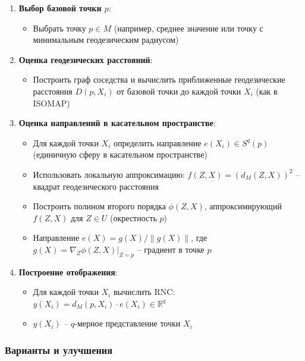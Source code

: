 \documentclass[a4paper,12pt]{article}
\begin{document}
\begin{enumerate}
    \item \textbf{Выбор базовой точки $p$}:
    \begin{itemize}
        \item Выбрать точку $p \in M$ (например, среднее значение или точку с минимальным геодезическим радиусом)
    \end{itemize}

    \item \textbf{Оценка геодезических расстояний}:
    \begin{itemize}
        \item Построить граф соседства и вычислить приближенные геодезические расстояния $D(p, X_i)$ от базовой точки до каждой точки $X_i$ (как в ISOMAP)
    \end{itemize}

    \item \textbf{Оценка направлений в касательном пространстве}:
    \begin{itemize}
        \item Для каждой точки $X_i$ определить направление $e(X_i) \in S^q(p)$ (единичную сферу в касательном пространстве)
        \item Использовать локальную аппроксимацию: $f(Z, X) = (d_M(Z, X))^2$ -- квадрат геодезического расстояния 
        \item Построить полином второго порядка $\phi(Z, X)$, аппроксимирующий $f(Z, X)$ для $Z \in U$ (окрестность $p$)
        \item Направление $e(X) = g(X)/\|g(X)\|$, где $g(X) = \nabla_Z \phi(Z, X)|_{Z=p}$ -- градиент в точке $p$
    \end{itemize}

    \item \textbf{Построение отображения}:
    \begin{itemize}
        \item Для каждой точки $X_i$ вычислить RNC: $y(X_i) = d_M(p, X_i) \cdot e(X_i) \in \mathbb{R}^q$
        \item $y(X_i)$ -- $q$-мерное представление точки $X_i$
    \end{itemize}
\end{enumerate}

\subsubsection{Варианты и улучшения}
\end{document}
